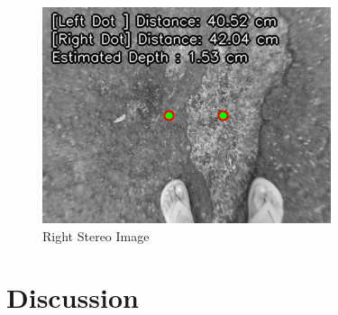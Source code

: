 \begin{figure}[htbp]
\begin{minipage}{0.32\textwidth}
		\includegraphics[width=\textwidth]{right.png}
		\caption{Right Stereo Image}
		\label{fig:image3}
	\end{minipage}
\end{figure}



\section{\textbf{Discussion}}

